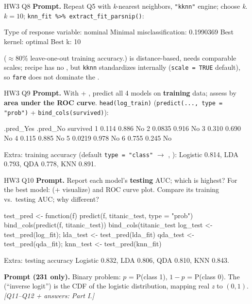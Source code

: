 \begin{qbox}{HW3 Q8}
\textbf{Prompt.} Repeat Q5 with \emph{k}-nearest neighbors, \texttt{"kknn"} engine; choose \emph{k}.
\ans $k = 10$; \texttt{knn\_fit \%>\% extract\_fit\_parsnip()}:
\begin{routput}
Type of response variable: nominal
Minimal misclassification: 0.1990369
Best kernel: optimal
Best k: 10
\end{routput}
($\approx$80\% leave-one-out training accuracy.)  is distance-based, needs comparable scales; recipe has no , but \texttt{kknn} standardizes internally (\texttt{scale = TRUE} default), so \texttt{fare} does not dominate the .
\end{qbox}

\begin{qbox}{HW3 Q9}
\textbf{Prompt.} With  + , predict all 4 models on \textbf{training} data; assess by \textbf{area under the ROC curve}.
\ans \texttt{head(log\_train)} (\texttt{predict(..., type = "prob")} + \texttt{bind\_cols(survived)}):
\begin{routput}
  .pred_Yes .pred_No survived
1    0.114     0.886 No
2    0.0835    0.916 No
3    0.310     0.690 No
4    0.115     0.885 No
5    0.0219    0.978 No
6    0.755     0.245 No
\end{routput}
Extra: training accuracy (default \texttt{type = "class"} $\to$ , ): Logistic 0.814, LDA 0.793, QDA 0.778, KNN 0.891.
\end{qbox}

\begin{qbox}{HW3 Q10}
\textbf{Prompt.} Report each model's \textbf{testing} AUC; which is highest? For the best model:  (+ visualize) and ROC curve plot. Compare its training vs.\ testing AUC; why different?
\begin{rcode}
test_pred <- function(f) predict(f, titanic_test, type = "prob") %
  bind_cols(predict(f, titanic_test)) %
  bind_cols(titanic_test %
log_test <- test_pred(log_fit); lda_test <- test_pred(lda_fit)
qda_test <- test_pred(qda_fit); knn_test <- test_pred(knn_fit)
\end{rcode}
Extra: testing accuracy Logistic 0.832, LDA 0.806, QDA 0.810, KNN 0.843.
\end{qbox}

\textbf{Prompt (231 only).} Binary problem: $p$ = P(class 1), $1-p$ = P(class 0). The \emph{} (``inverse logit'') is the CDF of the logistic distribution, mapping real \emph{z} to $(0, 1)$. {\color{figgray}\itshape [Q11--Q12 + answers: Part I.]}
